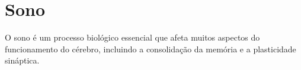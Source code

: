 \section{Sono}

O sono é um processo biológico essencial que afeta muitos aspectos do funcionamento do cérebro, incluindo a consolidação da
memória e a plasticidade sináptica.